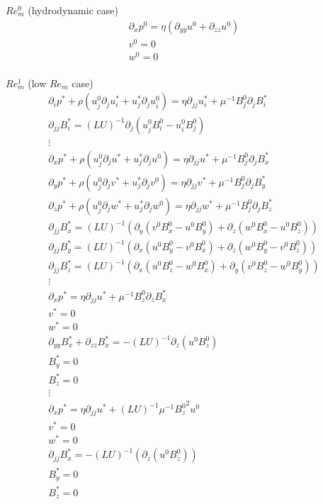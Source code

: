 \documentclass[11pt]{article}
\newcommand{\PD}{\partial}
\begin{document}
$Re_m^0$ (hydrodynamic case)
\begin{equation}\begin{aligned}
\PD_x p^0 = \eta (\PD_{yy} u^0 + \PD_{zz} u^0) \\
v^0 = 0 \\
w^0 = 0 \\
\end{aligned}\end{equation}

$Re_m^1$ (low $Re_m$ case)
\begin{equation}\begin{aligned}
\PD_i p^* + \rho (u_j^0 \PD_j u_i^* + u_j^* \PD_j u_i^0) = \eta \PD_{jj} u_i^* + \mu^{-1} B_j^0 \PD_j B_i^* \\
\PD_{jj} B_i^* = (LU)^{-1} \PD_j (u_j^0 B_i^0 - u_i^0 B_j^0) \\
\vdots \\
\PD_x p^* + \rho (u_j^0 \PD_j u^* + u_j^* \PD_j u^0) = \eta \PD_{jj} u^* + \mu^{-1} B_j^0 \PD_j B_x^* \\
\PD_y p^* + \rho (u_j^0 \PD_j v^* + u_j^* \PD_j v^0) = \eta \PD_{jj} v^* + \mu^{-1} B_j^0 \PD_j B_y^* \\
\PD_z p^* + \rho (u_j^0 \PD_j w^* + u_j^* \PD_j w^0) = \eta \PD_{jj} w^* + \mu^{-1} B_j^0 \PD_j B_z^* \\
\PD_{jj} B_x^* = (LU)^{-1} (\PD_y (v^0 B_x^0 - u^0 B_y^0) + \PD_z (w^0 B_x^0 - u^0 B_z^0)) \\
\PD_{jj} B_y^* = (LU)^{-1} (\PD_x (u^0 B_y^0 - v^0 B_x^0) + \PD_z (w^0 B_y^0 - v^0 B_z^0)) \\
\PD_{jj} B_z^* = (LU)^{-1} (\PD_x (u^0 B_z^0 - w^0 B_x^0) + \PD_y (v^0 B_z^0 - w^0 B_y^0)) \\
\vdots \\
\PD_x p^* = \eta \PD_{jj} u^* + \mu^{-1} B_z^0 \PD_z B_x^* \\
v^* = 0 \\
w^* = 0 \\
\PD_{yy} B_x^* + \PD_{zz} B_x^* =-(LU)^{-1} \PD_z (u^0 B_z^0) \\
B_y^* = 0 \\
B_z^* = 0 \\
\vdots \\
\PD_x p^* = \eta \PD_{jj} u^* + (LU)^{-1} \mu^{-1} {B_z^0}^2 u^0 \\
v^* = 0 \\
w^* = 0 \\
\PD_{jj} B_x^* =-(LU)^{-1} (\PD_z (u^0 B_z^0)) \\
B_y^* = 0 \\
B_z^* = 0 \\
\end{aligned}\end{equation}
\end{document}
